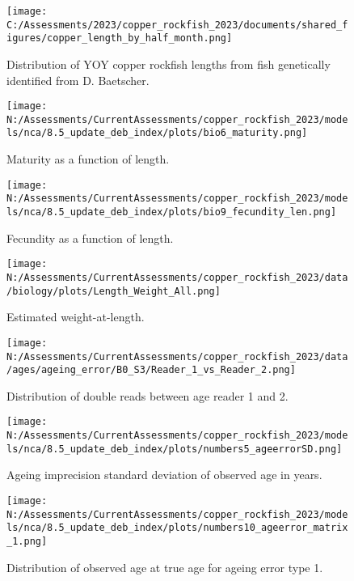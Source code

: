 \documentclass[11pt,
  english,
  letterpaper,
]{article}
\begin{document}
\begin{figure}
\centering
\texttt{[image: C:/Assessments/2023/copper\_rockfish\_2023/documents/shared\_figures/copper\_length\_by\_half\_month.png]}
\caption{Distribution of YOY copper rockfish lengths from fish genetically identified from D. Baetscher.\label{fig:copper-smurf-length}}
\end{figure}

\begin{figure}
\centering
\texttt{[image: N:/Assessments/CurrentAssessments/copper\_rockfish\_2023/models/nca/8.5\_update\_deb\_index/plots/bio6\_maturity.png]}
\caption{Maturity as a function of length.\label{fig:maturity}}
\end{figure}

\begin{figure}
\centering
\texttt{[image: N:/Assessments/CurrentAssessments/copper\_rockfish\_2023/models/nca/8.5\_update\_deb\_index/plots/bio9\_fecundity\_len.png]}
\caption{Fecundity as a function of length.\label{fig:fecundity}}
\end{figure}

\begin{figure}
\centering
\texttt{[image: N:/Assessments/CurrentAssessments/copper\_rockfish\_2023/data/biology/plots/Length\_Weight\_All.png]}
\caption{Estimated weight-at-length.\label{fig:weight-length}}
\end{figure}

\begin{figure}
\centering
\texttt{[image: N:/Assessments/CurrentAssessments/copper\_rockfish\_2023/data/ages/ageing\_error/B0\_S3/Reader\_1\_vs\_Reader\_2.png]}
\caption{Distribution of double reads between age reader 1 and 2.\label{fig:age-error-dist}}
\end{figure}

\begin{figure}
\centering
\texttt{[image: N:/Assessments/CurrentAssessments/copper\_rockfish\_2023/models/nca/8.5\_update\_deb\_index/plots/numbers5\_ageerrorSD.png]}
\caption{Ageing imprecision standard deviation of observed age in years.\label{fig:age-error}}
\end{figure}

\begin{figure}
\centering
\texttt{[image: N:/Assessments/CurrentAssessments/copper\_rockfish\_2023/models/nca/8.5\_update\_deb\_index/plots/numbers10\_ageerror\_matrix\_1.png]}
\caption{Distribution of observed age at true age for ageing error type 1.\label{fig:age-error-matrix}}
\end{figure}
\end{document}
